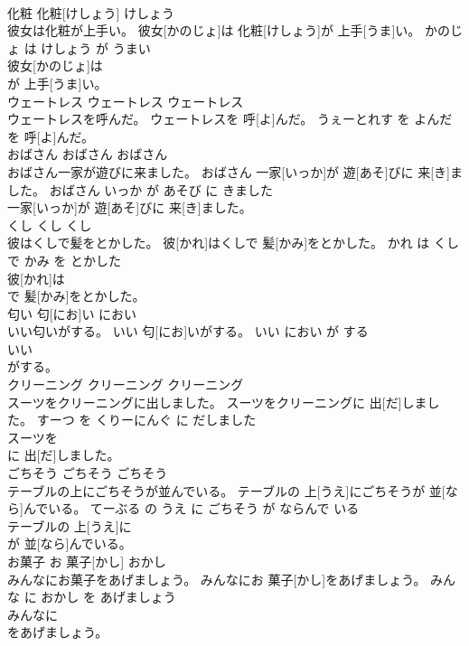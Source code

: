 \documentclass[8pt]{extreport}
\begin{document}
\begin{CJK}{UTF8}{min}
\\	化粧	化粧[けしょう]	けしょう	
\\	彼女は化粧が上手い。	彼女[かのじょ]は 化粧[けしょう]が 上手[うま]い。	かのじょ は けしょう が うまい	
\\	彼女[かのじょ]は
\\	が 上手[うま]い。			
\\	ウェートレス	ウェートレス	ウェートレス	
\\	ウェートレスを呼んだ。	ウェートレスを 呼[よ]んだ。	うぇーとれす を よんだ	
\\	を 呼[よ]んだ。			
\\	おばさん	おばさん	おばさん	
\\	おばさん一家が遊びに来ました。	おばさん 一家[いっか]が 遊[あそ]びに 来[き]ました。	おばさん いっか が あそび に きました	
\\	一家[いっか]が 遊[あそ]びに 来[き]ました。			
\\	くし	くし	くし	
\\	彼はくしで髪をとかした。	彼[かれ]はくしで 髪[かみ]をとかした。	かれ は くし で かみ を とかした	
\\	彼[かれ]は
\\	で 髪[かみ]をとかした。			
\\	匂い	匂[にお]い	におい	
\\	いい匂いがする。	いい 匂[にお]いがする。	いい におい が する	
\\	いい
\\	がする。			
\\	クリーニング	クリーニング	クリーニング	
\\	スーツをクリーニングに出しました。	スーツをクリーニングに 出[だ]しました。	すーつ を くりーにんぐ に だしました	
\\	スーツを
\\	に 出[だ]しました。			
\\	ごちそう	ごちそう	ごちそう	
\\	テーブルの上にごちそうが並んでいる。	テーブルの 上[うえ]にごちそうが 並[なら]んでいる。	てーぶる の うえ に ごちそう が ならんで いる	
\\	テーブルの 上[うえ]に
\\	が 並[なら]んでいる。			
\\	お菓子	お 菓子[かし]	おかし	
\\	みんなにお菓子をあげましょう。	みんなにお 菓子[かし]をあげましょう。	みんな に おかし を あげましょう	
\\	みんなに
\\	をあげましょう。			

\end{CJK}
\end{document}
